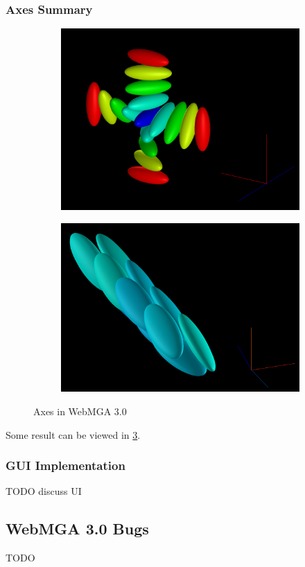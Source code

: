 \subsubsection{Axes Summary}
\begin{figure}
  \begin{center}
    \begin{subfigure}{0.4\textwidth}
      \includegraphics[width=\linewidth]{assets/images/axes/2_new_1}
      \caption{}
      \label{fig:2_new_1}
    \end{subfigure}
    \begin{subfigure}{0.4\textwidth}
      \includegraphics[width=\linewidth]{assets/images/axes/2_new_2}
      \caption{}
      \label{fig:2_new_2}
    \end{subfigure}
  \end{center}
  \caption{Axes in WebMGA 3.0}
  \label{fig:new_axes}
\end{figure}

Some result can be viewed in \cref{fig:new_axes}.

\subsubsection{GUI Implementation}
TODO discuss UI

\subsection{WebMGA 3.0 Bugs}
TODO
